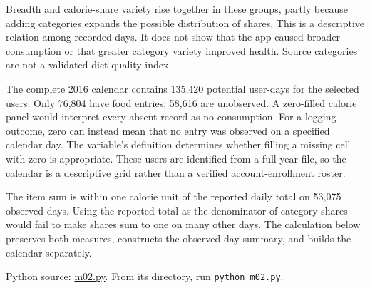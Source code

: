 Breadth and calorie-share variety rise together in these groups, partly
because adding categories expands the possible distribution of shares.
This is a descriptive relation among recorded days. It does not show
that the app caused broader consumption or that greater category variety
improved health. Source categories are not a validated diet-quality
index.

The complete 2016 calendar contains 135,420 potential user-days for the
selected users. Only 76,804 have food entries; 58,616 are unobserved. A
zero-filled calorie panel would interpret every absent record as no
consumption. For a logging outcome, zero can instead mean that no entry
was observed on a specified calendar day. The variable's definition
determines whether filling a missing cell with zero is appropriate.
These users are identified from a full-year file, so the calendar is a
descriptive grid rather than a verified account-enrollment roster.

The item sum is within one calorie unit of the reported daily total on
53,075 observed days. Using the reported total as the denominator of
category shares would fail to make shares sum to one on many other days.
The calculation below preserves both measures, constructs the
observed-day summary, and builds the calendar separately.

\FloatBarrier
{}
Python source:
\href{../03_Data_and_Code/mHealth/recurring_examples/m02.py}{m02.py}.
From its directory, run \texttt{python\ m02.py}.

